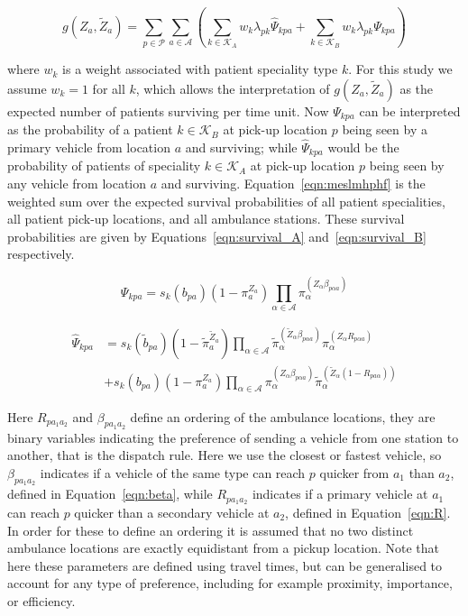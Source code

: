 \documentclass[numbers,webpdf,imaman]{ima-authoring-template}%
\begin{document}
\begin{equation}\label{eqn:meslmhphf}
g\left(Z_a, \tilde{Z}_a\right) =
\sum_{p \in \mathcal{P}} \sum_{a \in \mathcal{A}}
\left( \sum_{k \in \mathcal{K}_A}  w_k \lambda_{pk} \hat{\Psi}_{kpa} +
\sum_{k \in \mathcal{K}_B}  w_k \lambda_{pk} \Psi_{kpa} \right)
\end{equation}

\noindent
where $w_k$ is a weight associated with patient speciality type $k$. For this
study we assume $w_k = 1$ for all $k$, which allows the interpretation of
$g\left(Z_a, \tilde{Z}_a\right)$ as the expected number of patients surviving
per time unit. Now $\Psi_{kpa}$ can be interpreted as
the probability of a patient $k \in \mathcal{K}_B$ at pick-up location $p$
being seen by a primary vehicle from location $a$ and surviving; while
$\hat{\Psi}_{kpa}$ would be the probability of patients of speciality
$k \in \mathcal{K}_A$ at pick-up location $p$ being seen by any vehicle from
location $a$ and surviving. Equation~\ref{eqn:meslmhphf} is the weighted sum
over the expected survival probabilities of all patient specialities, all
patient pick-up locations, and all ambulance stations. These survival
probabilities are given by Equations~\ref{eqn:survival_A}
and~\ref{eqn:survival_B} respectively.

\begin{equation}\label{eqn:survival_A}
\Psi_{kpa} = s_k\left( b_{pa} \right)
\left(1 - \pi_{a}^{Z_a} \right)
\prod_{\alpha \in \mathcal{A}}
\pi_{\alpha}^{\left(Z_{\alpha} \beta_{p\alpha a} \right)}
\end{equation}

\begin{align}\label{eqn:survival_B}
\hat{\Psi}_{kpa} &= s_k\left(\tilde{b}_{pa}\right)
\left(1 - \tilde{\pi}_{a}^{\tilde{Z}_a} \right)
\prod_{\alpha \in \mathcal{A}}
\tilde{\pi}_{\alpha}^{\left(\tilde{Z}_{\alpha} \beta_{p\alpha a}\right)}
\pi_{\alpha}^{\left(Z_{\alpha} R_{p \alpha a}\right) } \nonumber \\
&+ s_k\left(b_{pa}\right) \left(1 - \pi_{a}^{Z_a} \right)
\prod_{\alpha \in \mathcal{A}}
\pi_{\alpha}^{\left(Z_{\alpha}\beta_{p\alpha a}\right)}
\tilde{\pi}_{\alpha}^{\left(\tilde{Z}_{\alpha}
\left(1 - R _{p a\alpha}\right)\right)}
\end{align}

Here $R_{p a_1 a_2}$ and $\beta_{p a_1 a_2}$ define an ordering
of the ambulance locations, they are binary variables indicating the preference
of sending a vehicle from one station to another, that is the dispatch rule.
Here we use the closest or fastest vehicle, so $\beta_{p a_1 a_2}$ indicates if
a vehicle of the same type can reach $p$ quicker from $a_1$ than $a_2$, defined
in Equation~\ref{eqn:beta}, while $R_{p a_1 a_2}$ indicates if a primary vehicle
at $a_1$ can reach $p$ quicker than a secondary vehicle at $a_2$, defined in
Equation~\ref{eqn:R}. In order for these to define an ordering
it is assumed that no two distinct ambulance locations are exactly equidistant
from a pickup location. Note that here these parameters are defined using
travel times, but can be generalised to account for any type of preference,
including for example proximity, importance, or efficiency.
\end{document}
